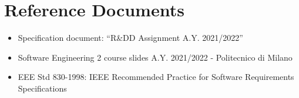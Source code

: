 \section{Reference Documents}

\begin{itemize}
    \item Specification document: “R\&DD Assignment A.Y. 2021/2022”
    \item Software Engineering 2 course slides A.Y. 2021/2022 - Politecnico di Milano 
    \item EEE Std 830-1998: IEEE Recommended Practice for Software Requirements Specifications
\end{itemize}


